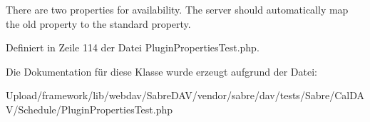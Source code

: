 There are two properties for availability. The server should automatically map the old property to the standard property. 

Definiert in Zeile 114 der Datei Plugin\+Properties\+Test.\+php.



Die Dokumentation für diese Klasse wurde erzeugt aufgrund der Datei\+:\begin{DoxyCompactItemize}
\item 
Upload/framework/lib/webdav/\+Sabre\+D\+A\+V/vendor/sabre/dav/tests/\+Sabre/\+Cal\+D\+A\+V/\+Schedule/Plugin\+Properties\+Test.\+php\end{DoxyCompactItemize}
